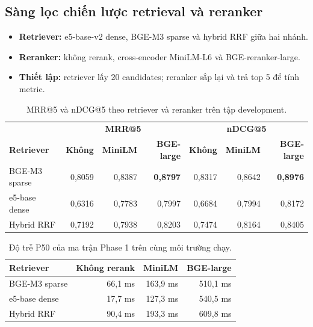 \subsection{Sàng lọc chiến lược retrieval và reranker}

\begin{itemize}
  \item \textbf{Retriever:} e5-base-v2 dense, BGE-M3 sparse và hybrid RRF giữa
  hai nhánh.
  \item \textbf{Reranker:} không rerank, cross-encoder MiniLM-L6 và
  BGE-reranker-large.
  \item \textbf{Thiết lập:} retriever lấy 20 candidates; reranker sắp lại và
  trả top 5 để tính metric.
\end{itemize}

\begin{table}[H]
  \centering
  \caption{MRR@5 và nDCG@5 theo retriever và reranker trên tập development.}
  \label{tab:phase1-reranker-matrix}
  \small
  \setlength{\tabcolsep}{4.5pt}
  \begin{tabular}{lrrr|rrr}
    \toprule
    & \multicolumn{3}{c|}{\textbf{MRR@5}}
    & \multicolumn{3}{c}{\textbf{nDCG@5}} \\
    \textbf{Retriever} & \textbf{Không} & \textbf{MiniLM} & \textbf{BGE-large}
    & \textbf{Không} & \textbf{MiniLM} & \textbf{BGE-large} \\
    \midrule
    BGE-M3 sparse & 0,8059 & 0,8387 & \textbf{0,8797} & 0,8317 & 0,8642 & \textbf{0,8976} \\
    e5-base dense & 0,6316 & 0,7783 & 0,7997 & 0,6684 & 0,7994 & 0,8172 \\
    Hybrid RRF    & 0,7192 & 0,7938 & 0,8203 & 0,7474 & 0,8164 & 0,8405 \\
    \bottomrule
  \end{tabular}
\end{table}

\begin{table}[H]
  \centering
  \caption{Độ trễ P50 của ma trận Phase 1 trên cùng môi trường chạy.}
  \label{tab:phase1-reranker-latency}
  \small
  \begin{tabular}{lrrr}
    \toprule
    \textbf{Retriever} & \textbf{Không rerank} & \textbf{MiniLM} &
    \textbf{BGE-large} \\
    \midrule
    BGE-M3 sparse & 66,1 ms & 163,9 ms & 510,1 ms \\
    e5-base dense & 17,7 ms & 127,3 ms & 540,5 ms \\
    Hybrid RRF    & 90,4 ms & 193,3 ms & 609,8 ms \\
    \bottomrule
  \end{tabular}
\end{table}

